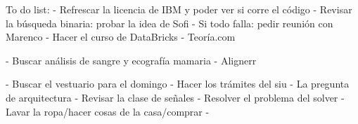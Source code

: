 To do list:
- Refrescar la licencia de IBM y poder ver si corre el código
- Revisar la búsqueda binaria: probar la idea de Sofi
- Si todo falla: pedir reunión con Marenco
- Hacer el curso de DataBricks
- Teoría.com

- Buscar análisis de sangre y ecografía mamaria
- Alignerr

- Buscar el vestuario para el domingo
- Hacer los trámites del siu
- La pregunta de arquitectura
- Revisar la clase de señales
- Resolver el problema del solver
- Lavar la ropa/hacer cosas de la casa/comprar
- 